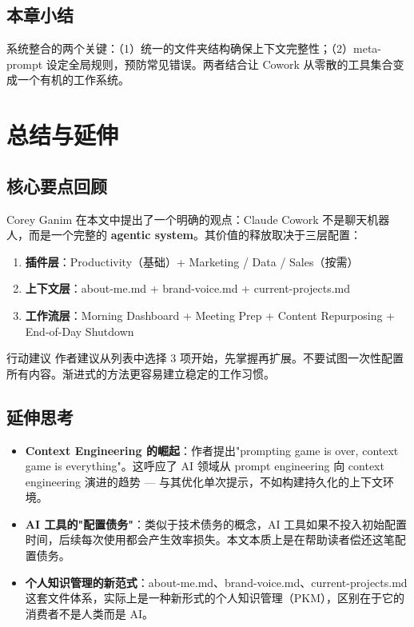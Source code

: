 \documentclass[a4paper]{article}
\begin{document}
\subsection{本章小结}

系统整合的两个关键：（1）统一的文件夹结构确保上下文完整性；（2）meta-prompt 设定全局规则，预防常见错误。两者结合让 Cowork 从零散的工具集合变成一个有机的工作系统。

\section{总结与延伸}

\subsection{核心要点回顾}

Corey Ganim 在本文中提出了一个明确的观点：Claude Cowork 不是聊天机器人，而是一个完整的 \textbf{agentic system}。其价值的释放取决于三层配置：

\begin{enumerate}
    \item \textbf{插件层}：Productivity（基础）+ Marketing / Data / Sales（按需）
    \item \textbf{上下文层}：about-me.md + brand-voice.md + current-projects.md
    \item \textbf{工作流层}：Morning Dashboard + Meeting Prep + Content Repurposing + End-of-Day Shutdown
\end{enumerate}

\begin{importantbox}{行动建议}
作者建议从列表中选择 3 项开始，先掌握再扩展。不要试图一次性配置所有内容。渐进式的方法更容易建立稳定的工作习惯。
\end{importantbox}

\subsection{延伸思考}

\begin{itemize}
    \item \textbf{Context Engineering 的崛起}：作者提出"prompting game is over, context game is everything"。这呼应了 AI 领域从 prompt engineering 向 context engineering 演进的趋势 --- 与其优化单次提示，不如构建持久化的上下文环境。
    \item \textbf{AI 工具的"配置债务"}：类似于技术债务的概念，AI 工具如果不投入初始配置时间，后续每次使用都会产生效率损失。本文本质上是在帮助读者偿还这笔配置债务。
    \item \textbf{个人知识管理的新范式}：about-me.md、brand-voice.md、current-projects.md 这套文件体系，实际上是一种新形式的个人知识管理（PKM），区别在于它的消费者不是人类而是 AI。
\end{itemize}

\end{document}
